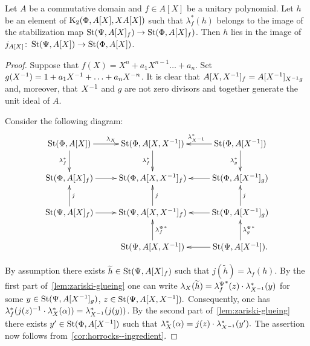 \begin{lemma} \label{lem:horrocks-b}
 Let $A$ be a commutative domain and $f \in A[X]$ be a unitary polynomial.
 Let $h$ be an element of $\operatorname{K}_2(\Phi, A[X], XA[X])$ such that $\lambda_f^*(h)$ belongs to the image of the stabilization map
 $\operatorname{St}(\Psi, A[X]_f) \to \operatorname{St}(\Phi, A[X]_f)$.
 Then $h$ lies in the image of $j_{A[X]}\colon\operatorname{St}(\Psi, A[X]) \to \operatorname{St}(\Phi, A[X])$.
\end{lemma}
\begin{proof}
    Suppose that $f(X) = X^n + a_1 X^{n-1} \ldots + a_n$.
    Set $g(X^{-1}) = 1 + a_1 X^{-1} + \ldots + a_{n} X^{-n}$.
    It is clear that $A[X, X^{-1}]_f = A[X^{-1}]_{X^{-1} g}$ and, moreover, that $X^{-1}$ and $g$ are not zero divisors and together generate the unit ideal of $A$.

    Consider the following diagram:
    \[ \xymatrix{\St(\Phi, A[X]) \ar[r]^{\lambda_X} \ar[d]_{\lambda_f^*} & \St(\Phi, A[X, X\inv]) \ar[d]_{\lambda_f^*}  & \St(\Phi, A[X\inv]) \ar[l]_{\lambda_{X\inv}^*} \ar[d]_{\lambda_g^*}  \\
                 \St(\Phi, A[X]_f) \ar[r] & \St(\Phi, A[X, X\inv]_f) & \St(\Phi, A[X\inv]_g) \ar[l] \\
                 \St(\Psi, A[X]_f) \ar[r] \ar[u]_j & \St(\Psi, A[X, X\inv]_f) \ar[u]_j & \St(\Psi, A[X\inv]_g) \ar[l] \ar[u]_j \\
                                   & \St(\Psi, A[X, X\inv]) \ar[u]_{{\lambda_f^\Psi}^*}   & \St(\Psi, A[X\inv]). \ar[l] \ar[u]_{{\lambda_g^\Psi}^*}}\]

    By assumption there exists $\widetilde{h} \in \operatorname{St}(\Psi, A[X]_f)$ such that $j(\widetilde{h}) = \lambda_f(h)$.
    By the first part of~\cref{lem:zariski-glueing} one can write 
     $\lambda_X(\widetilde{h}) = {\lambda_f^\Psi}^*(z) \cdot \lambda_{X^{-1}}^*(y)$
     for some $y \in \operatorname{St}(\Psi, A[X^{-1}]_g)$, $z \in \operatorname{St}(\Psi, A[X, X^{-1}]).$
    Consequently, one has $\lambda_f^*(j(z)^{-1} \cdot \lambda_X^*(\alpha)) = \lambda_{X^{-1}}^*(j(y))$.
    By the second part of~\cref{lem:zariski-glueing} there exists $y' \in \operatorname{St}(\Phi, A[X^{-1}])$ such that $\lambda_X^*(\alpha) = j(z) \cdot \lambda_{X^{-1}}^*(y').$
    The assertion now follows from~\cref{cor:horrocks--ingredient}.
\end{proof}

